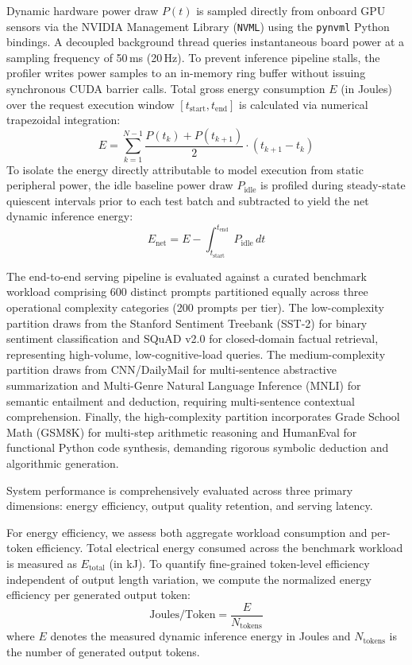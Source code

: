 \documentclass[runningheads]{llncs}
\begin{document}
Dynamic hardware power draw $P(t)$ is sampled directly from onboard GPU sensors via the NVIDIA Management Library (\texttt{NVML}) using the \texttt{pynvml} Python bindings. A decoupled background thread queries instantaneous board power at a sampling frequency of 50\,ms (20\,Hz). To prevent inference pipeline stalls, the profiler writes power samples to an in-memory ring buffer without issuing synchronous CUDA barrier calls. Total gross energy consumption $E$ (in Joules) over the request execution window $[t_{\text{start}}, t_{\text{end}}]$ is calculated via numerical trapezoidal integration:
\begin{equation}
E = \sum_{k=1}^{N-1} \frac{P(t_k) + P(t_{k+1})}{2} \cdot (t_{k+1} - t_k)
\end{equation}
To isolate the energy directly attributable to model execution from static peripheral power, the idle baseline power draw $P_{\text{idle}}$ is profiled during steady-state quiescent intervals prior to each test batch and subtracted to yield the net dynamic inference energy:
\begin{equation}
E_{\text{net}} = E - \int_{t_{\text{start}}}^{t_{\text{end}}} P_{\text{idle}}\,dt
\end{equation}

The end-to-end serving pipeline is evaluated against a curated benchmark workload comprising 600 distinct prompts partitioned equally across three operational complexity categories (200 prompts per tier). The low-complexity partition draws from the Stanford Sentiment Treebank (SST-2) for binary sentiment classification and SQuAD v2.0 for closed-domain factual retrieval, representing high-volume, low-cognitive-load queries. The medium-complexity partition draws from CNN/DailyMail for multi-sentence abstractive summarization and Multi-Genre Natural Language Inference (MNLI) for semantic entailment and deduction, requiring multi-sentence contextual comprehension. Finally, the high-complexity partition incorporates Grade School Math (GSM8K) for multi-step arithmetic reasoning and HumanEval for functional Python code synthesis, demanding rigorous symbolic deduction and algorithmic generation.

System performance is comprehensively evaluated across three primary dimensions: energy efficiency, output quality retention, and serving latency. 

For energy efficiency, we assess both aggregate workload consumption and per-token efficiency. Total electrical energy consumed across the benchmark workload is measured as $E_{\text{total}}$ (in kJ). To quantify fine-grained token-level efficiency independent of output length variation, we compute the normalized energy efficiency per generated output token:
\begin{equation}
\text{Joules/Token} = \frac{E}{N_{\text{tokens}}}
\end{equation}
where $E$ denotes the measured dynamic inference energy in Joules and $N_{\text{tokens}}$ is the number of generated output tokens.
\end{document}
